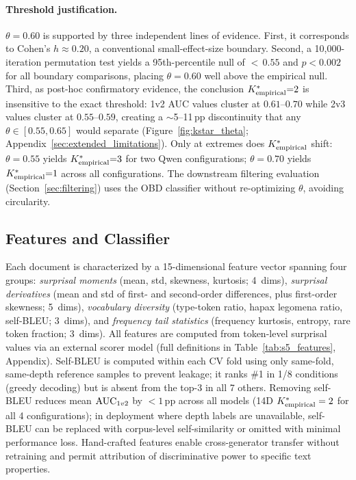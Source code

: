 \paragraph{Threshold justification.}
$\theta{=}0.60$ is supported by three independent lines of evidence.
First, it corresponds to Cohen's $h \approx 0.20$, a conventional small-effect-size boundary.
Second, a 10{,}000-iteration permutation test yields a 95th-percentile null of ${<}\,0.55$ and $p < 0.002$ for all boundary comparisons, placing $\theta{=}0.60$ well above the empirical null.
Third, as post-hoc confirmatory evidence, the conclusion ${K^*_{\text{empirical}}}{=}2$ is insensitive to the exact threshold: 1v2 AUC values cluster at $0.61$--$0.70$ while 2v3 values cluster at $0.55$--$0.59$, creating a ${\sim}$5--11\,pp discontinuity that any $\theta \in [0.55, 0.65]$ would separate (Figure~\ref{fig:kstar_theta}; Appendix~\ref{sec:extended_limitations}).
Only at extremes does ${K^*_{\text{empirical}}}$ shift: $\theta{=}0.55$ yields ${K^*_{\text{empirical}}}{=}3$ for two Qwen configurations; $\theta{=}0.70$ yields ${K^*_{\text{empirical}}}{=}1$ across all configurations.
The downstream filtering evaluation (Section~\ref{sec:filtering}) uses the OBD classifier without re-optimizing $\theta$, avoiding circularity.

\subsection{Features and Classifier}
\label{sec:features}

Each document is characterized by a 15-dimensional feature vector spanning four groups: \emph{surprisal moments} (mean, std, skewness, kurtosis; 4~dims), \emph{surprisal derivatives} (mean and std of first- and second-order differences, plus first-order skewness; 5~dims), \emph{vocabulary diversity} (type-token ratio, hapax legomena ratio, self-BLEU; 3~dims), and \emph{frequency tail statistics} (frequency kurtosis, entropy, rare token fraction; 3~dims).
All features are computed from token-level surprisal values via an external scorer model (full definitions in Table~\ref{tab:s5_features}, Appendix).
Self-BLEU is computed within each CV fold using only same-fold, same-depth reference samples to prevent leakage; it ranks \#1 in 1/8 conditions (greedy decoding) but is absent from the top-3 in all 7 others.
Removing self-BLEU reduces mean $\text{AUC}_{1v2}$ by $< 1$\,pp across all models (14D ${K^*_{\text{empirical}}} = 2$ for all 4 configurations); in deployment where depth labels are unavailable, self-BLEU can be replaced with corpus-level self-similarity or omitted with minimal performance loss.
Hand-crafted features enable cross-generator transfer without retraining and permit attribution of discriminative power to specific text properties.

